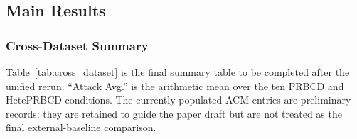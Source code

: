 \FloatBarrier
\subsection{Main Results}

\subsubsection{Cross-Dataset Summary}

Table~\ref{tab:cross_dataset} is the final summary table to be completed after the unified rerun. ``Attack Avg.'' is the arithmetic mean over the ten PRBCD and HetePRBCD conditions. The currently populated ACM entries are preliminary records; they are retained to guide the paper draft but are not treated as the final external-baseline comparison.

\begin{table}[htbp]
\centering
\small
\setlength{\tabcolsep}{3.5pt}
\caption{Cross-dataset accuracy under the unified protocol. Final results will be reported as mean $\pm$ standard deviation over five seeds.}
\label{tab:cross_dataset}
\end{table}

